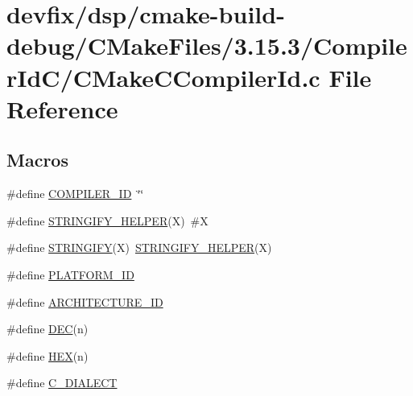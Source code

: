 \hypertarget{dsp_2cmake-build-debug_2CMakeFiles_23_815_83_2CompilerIdC_2CMakeCCompilerId_8c}{}\section{devfix/dsp/cmake-\/build-\/debug/\+C\+Make\+Files/3.15.3/\+Compiler\+Id\+C/\+C\+Make\+C\+Compiler\+Id.c File Reference}
\label{dsp_2cmake-build-debug_2CMakeFiles_23_815_83_2CompilerIdC_2CMakeCCompilerId_8c}
\subsection*{Macros}
\begin{DoxyCompactItemize}
\item 
\#define \hyperlink{dsp_2cmake-build-debug_2CMakeFiles_23_815_83_2CompilerIdC_2CMakeCCompilerId_8c_a81dee0709ded976b2e0319239f72d174}{C\+O\+M\+P\+I\+L\+E\+R\+\_\+\+ID}~\char`\"{}\char`\"{}
\item 
\#define \hyperlink{dsp_2cmake-build-debug_2CMakeFiles_23_815_83_2CompilerIdC_2CMakeCCompilerId_8c_a2ae9b72bb13abaabfcf2ee0ba7d3fa1d}{S\+T\+R\+I\+N\+G\+I\+F\+Y\+\_\+\+H\+E\+L\+P\+ER}(X)~\#X
\item 
\#define \hyperlink{dsp_2cmake-build-debug_2CMakeFiles_23_815_83_2CompilerIdC_2CMakeCCompilerId_8c_a43e1cad902b6477bec893cb6430bd6c8}{S\+T\+R\+I\+N\+G\+I\+FY}(X)~\hyperlink{net_2cmake-build-debug_2CMakeFiles_23_815_83_2CompilerIdCXX_2CMakeCXXCompilerId_8cpp_a2ae9b72bb13abaabfcf2ee0ba7d3fa1d}{S\+T\+R\+I\+N\+G\+I\+F\+Y\+\_\+\+H\+E\+L\+P\+ER}(X)
\item 
\#define \hyperlink{dsp_2cmake-build-debug_2CMakeFiles_23_815_83_2CompilerIdC_2CMakeCCompilerId_8c_adbc5372f40838899018fadbc89bd588b}{P\+L\+A\+T\+F\+O\+R\+M\+\_\+\+ID}
\item 
\#define \hyperlink{dsp_2cmake-build-debug_2CMakeFiles_23_815_83_2CompilerIdC_2CMakeCCompilerId_8c_aba35d0d200deaeb06aee95ca297acb28}{A\+R\+C\+H\+I\+T\+E\+C\+T\+U\+R\+E\+\_\+\+ID}
\item 
\#define \hyperlink{dsp_2cmake-build-debug_2CMakeFiles_23_815_83_2CompilerIdC_2CMakeCCompilerId_8c_ad1280362da42492bbc11aa78cbf776ad}{D\+EC}(n)
\item 
\#define \hyperlink{dsp_2cmake-build-debug_2CMakeFiles_23_815_83_2CompilerIdC_2CMakeCCompilerId_8c_a46d5d95daa1bef867bd0179594310ed5}{H\+EX}(n)
\item 
\#define \hyperlink{dsp_2cmake-build-debug_2CMakeFiles_23_815_83_2CompilerIdC_2CMakeCCompilerId_8c_a07f8e5783674099cd7f5110e22a78cdb}{C\+\_\+\+D\+I\+A\+L\+E\+CT}
\end{DoxyCompactItemize}
